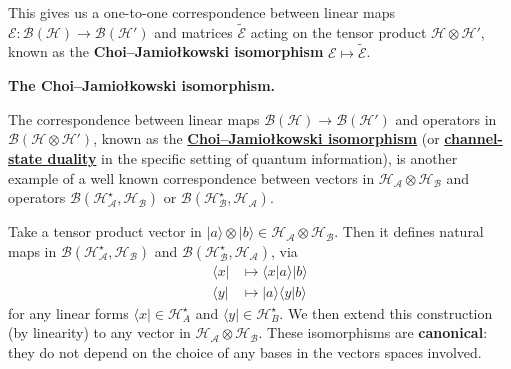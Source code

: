 \documentclass[fleqn,a4paper]{article}
\newenvironment{technical}[1]{\textbf{#1.}\par\vspace{.5\baselineskip}\everypar{\setlength{\parindent}{1.5em}}}{}
\theoremstyle{definition}
\theoremstyle{definition}
\theoremstyle{definition}
\theoremstyle{definition}
\theoremstyle{remark}
\begin{document}
This gives us a one-to-one correspondence between linear maps \(\mathcal{E}\colon\mathcal{B}(\mathcal{H})\to\mathcal{B}(\mathcal{H}')\) and matrices \(\widetilde{\mathcal{E}}\) acting on the tensor product \(\mathcal{H}\otimes\mathcal{H}'\), known as the \textbf{Choi--Jamiołkowski isomorphism} \(\mathcal{E}\mapsto\widetilde{\mathcal{E}}\).

\begin{technical}{The Choi--Jamiołkowski isomorphism}
The correspondence between linear maps \(\mathscr{B}(\mathcal{H})\to\mathscr{B}(\mathcal{H'})\) and operators in \(\mathscr{B}(\mathcal{H}\otimes\mathcal{H'})\), known as the \href{https://en.wikipedia.org/wiki/Choi\%E2\%80\%93Jamio\%C5\%82kowski_isomorphism}{\textbf{Choi--Jamiołkowski isomorphism}} (or \href{https://en.wikipedia.org/wiki/Channel-state_duality}{\textbf{channel-state duality}} in the specific setting of quantum information), is another example of a well known correspondence between vectors in \(\mathcal{H}_{\mathcal{A}}\otimes\mathcal{H}_{\mathcal{B}}\) and operators \(\mathscr{B}(\mathcal{H}_{\mathcal{A}}^\star,\mathcal{H}_{\mathcal{B}})\) or \(\mathscr{B}(\mathcal{H}_{\mathcal{B}}^\star,\mathcal{H}_{\mathcal{A}})\).

Take a tensor product vector in \(|a\rangle\otimes|b\rangle\in \mathcal{H}_{\mathcal{A}}\otimes\mathcal{H}_{\mathcal{B}}\).
Then it defines natural maps in \(\mathscr{B}(\mathcal{H}_{\mathcal{A}}^\star,\mathcal{H}_{\mathcal{B}})\) and \(\mathscr{B}(\mathcal{H}_{\mathcal{B}}^\star,\mathcal{H}_{\mathcal{A}})\), via
\[
  \begin{aligned}
    \langle x|
    &\longmapsto \langle x|a\rangle|b\rangle
  \\\langle y|
    &\longmapsto |a\rangle\langle y|b\rangle
  \end{aligned}
\]
for any linear forms \(\langle x|\in\mathcal{H}^\star_A\) and \(\langle y|\in\mathcal{H}^\star_B\).
We then extend this construction (by linearity) to any vector in \(\mathcal{H}_{\mathcal{A}}\otimes\mathcal{H}_{\mathcal{B}}\).
These isomorphisms are \textbf{canonical}: they do not depend on the choice of any bases in the vectors spaces involved.


\end{technical}
\end{document}
